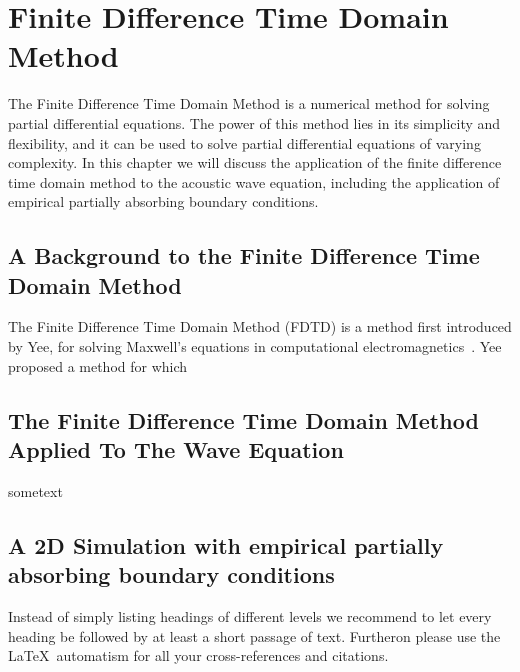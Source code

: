 %
%
%
\chapter{Finite Difference Time Domain Method}
\label{Introduction}
The Finite Difference Time Domain Method is a numerical method for solving partial differential equations. The power of this method lies in its simplicity and flexibility, and it can be used to solve partial differential equations of varying complexity. In this chapter we will discuss the application of the finite difference time domain method to the acoustic wave equation, including the application of empirical partially absorbing boundary conditions.

\section{A Background to the Finite Difference Time Domain Method}
The Finite Difference Time Domain Method (FDTD) is a method first introduced by Yee, for solving Maxwell's equations in computational electromagnetics~\cite{Yee1966}. Yee proposed a method for which  

\section{The Finite Difference Time Domain Method Applied To The Wave Equation}
sometext

\section{A 2D Simulation with empirical partially absorbing boundary conditions}
Instead of simply listing headings of different levels we recommend to let every heading be followed by at least a short passage of text. Furtheron please use the \LaTeX\ automatism for all your cross-references and citations.

